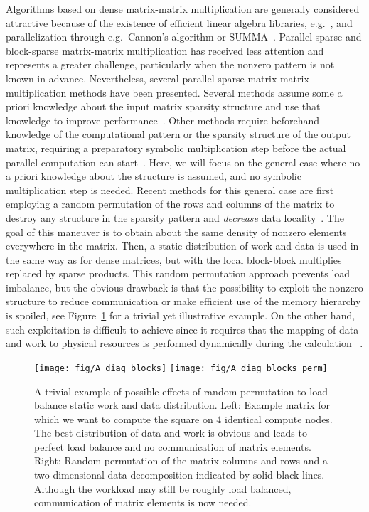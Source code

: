 \documentclass{elsarticle}
\begin{document}
Algorithms based on dense matrix-matrix multiplication are generally
considered attractive because of the existence of efficient linear
algebra libraries, e.g.~\cite{Goto-matrix-mul, whaley04}, and
parallelization through e.g.~Cannon's algorithm or
SUMMA~\cite{summa}. Parallel sparse and block-sparse matrix-matrix
multiplication has received less attention and represents a greater
challenge, particularly when the nonzero pattern is not known in
advance.  Nevertheless, several parallel sparse matrix-matrix
multiplication methods have been presented.  Several methods assume
some a priori knowledge about the input matrix sparsity structure and
use that knowledge to improve
performance~\cite{conquest-sparsematrix,Challacombe-sparsematrix,
  onetep-sparsematrix,WeberEtAlMidpointMmul2015}.  Other methods
require beforehand knowledge of the computational pattern or the
sparsity structure of the output matrix, requiring a preparatory
symbolic multiplication step before the actual parallel computation
can start~\cite{Akbudak2014, Ballard2016}.  Here, we will focus on the
general case where no a priori knowledge about the structure is
assumed, and no symbolic multiplication step is needed. Recent methods
for this general case are first employing a random permutation of the
rows and columns of the matrix to destroy any structure in the
sparsity pattern and \emph{decrease} data
locality~\cite{BulucGilbert2012, Borstnik2014}.
The goal of this
maneuver is to obtain about the same density of nonzero elements
everywhere in the matrix. Then, a static distribution of work and data
is used in the same way as for dense matrices, but with the local
block-block multiplies replaced by sparse products. This random permutation approach prevents load imbalance, but the obvious
drawback is that the possibility to exploit the nonzero structure to
reduce communication or make efficient use of the memory hierarchy is
spoiled, see Figure~\ref{fig:random_destruction} for a trivial yet
illustrative example.  On the other hand, such exploitation is
difficult to achieve since it requires that the mapping of data and
work to physical resources is performed dynamically during the
calculation~ \cite{communication_optimal_2}.
\begin{figure}
  \begin{center}
    \texttt{[image: fig/A\_diag\_blocks]}
    \texttt{[image: fig/A\_diag\_blocks\_perm]}
  \end{center} 
  \caption{A trivial example of possible effects of random permutation
    to load balance static work and data distribution. Left: Example
    matrix for which we want to compute the square on 4 identical
    compute nodes. The best distribution of data and work is obvious
    and leads to perfect load balance and no communication of matrix
    elements. Right: Random permutation of the matrix columns and rows
    and a two-dimensional data decomposition indicated by solid black
    lines.  Although the workload may still be roughly load balanced,
    communication of matrix elements is now
    needed.  \label{fig:random_destruction}}
\end{figure}
\end{document}
